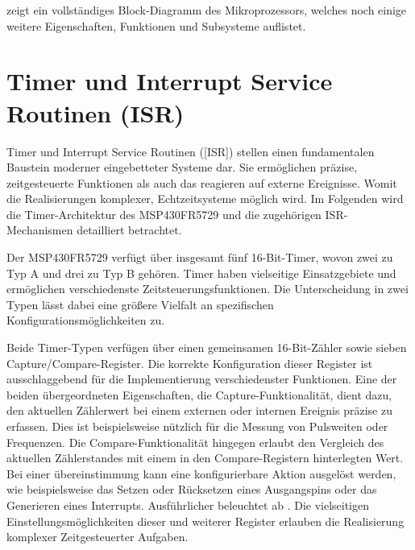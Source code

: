 \newpage
{} zeigt ein vollst\"andiges Block-Diagramm des Mikroprozessors, welches noch einige weitere Eigenschaften, Funktionen und Subsysteme auflistet.\AI


\section{Timer und Interrupt Service Routinen (ISR)}
\label{sec:TIMER&ISR}

Timer und Interrupt Service Routinen ([ISR]) stellen einen fundamentalen Baustein moderner eingebetteter Systeme dar. Sie erm\"oglichen pr\"azise, zeitgesteuerte Funktionen als auch das reagieren auf externe Ereignisse. Womit die Realisierungen komplexer, Echtzeitsysteme m\"oglich wird. Im Folgenden wird die Timer-Architektur des MSP430FR5729 und die zugeh\"origen ISR-Mechanismen detailliert betrachtet.

Der MSP430FR5729 verf\"ugt \"uber insgesamt f\"unf 16-Bit-Timer, wovon zwei zu Typ A und drei zu Typ B geh\"oren. Timer haben vielseitige Einsatzgebiete und erm\"oglichen verschiedenste Zeitsteuerungsfunktionen. Die Unterscheidung in zwei Typen l\"asst dabei eine gr\"o{\ss}ere Vielfalt an spezifischen Konfigurationsm\"oglichkeiten zu.

\newpage
Beide Timer-Typen verf\"ugen \"uber einen gemeinsamen 16-Bit-Z\"ahler sowie sieben Capture/Compare-Register. Die korrekte Konfiguration dieser Register ist ausschlaggebend f\"ur die Implementierung verschiedenster Funktionen. Eine der beiden \"ubergeordneten Eigenschaften, die Capture-Funktionalit\"at, dient dazu, den aktuellen Z\"ahlerwert bei einem externen oder internen Ereignis pr\"azise zu erfassen. Dies ist beispielsweise n\"utzlich f\"ur die Messung von Pulsweiten oder Frequenzen. Die Compare-Funktionalit\"at hingegen erlaubt den Vergleich des aktuellen Z\"ahlerstandes mit einem in den Compare-Registern hinterlegten Wert. Bei einer \"ubereinstimmung kann eine konfigurierbare Aktion ausgel\"ost werden, wie beispielsweise das Setzen oder R\"ucksetzen eines Ausgangspins oder das Generieren eines Interrupts. Ausf\"uhrlicher beleuchtet ab . Die vielseitigen Einstellungsm\"oglichkeiten dieser und weiterer Register erlauben die Realisierung komplexer Zeitgesteuerter Aufgaben. 

